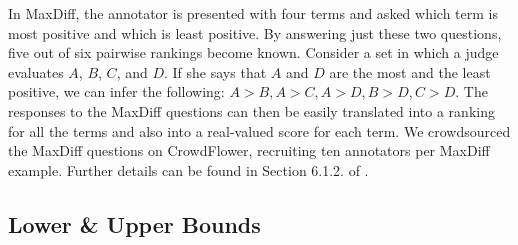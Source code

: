 \documentclass[11pt]{article}
\begin{document}
In MaxDiff, the annotator is presented with four terms and asked
which term is most positive and which is least positive.
By answering just these two questions,
five out of six pairwise rankings become known.
Consider a set in which a judge evaluates $A$, $B$, $C$, and $D$.
If she says that $A$ and $D$ are the most and the least positive,
we can infer the following:
$A > B, A > C, A > D, B > D, C > D$.
The responses to the MaxDiff questions can then be easily translated into a ranking for all the terms and also into a real-valued score for each term.  
We crowdsourced the MaxDiff questions on CrowdFlower, recruiting ten annotators per MaxDiff example.
Further details can be found in Section  6.1.2. of \cite{NRCJAIR14}.

\subsection{Lower \& Upper Bounds}


\end{document}

